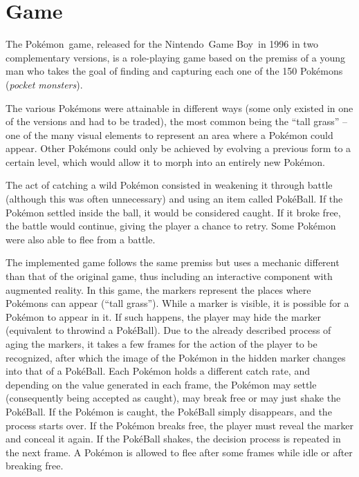 \section{Game}
\label{sec:game}

The Pokémon\textregistered\ game, released for the Nintendo\textregistered\ Game Boy\textregistered\ in 1996 in two complementary versions, is a role-playing game based on the premiss of a young man who takes the goal of finding and capturing each one of the 150 Pokémons (\textit{pocket monsters}).

The various Pokémons were attainable in different ways (some only existed in one of the versions and had to be traded), the most common being the ``tall grass'' -- one of the many visual elements to represent an area where a Pokémon could appear. Other Pokémons could only be achieved by evolving a previous form to a certain level, which would allow it to morph into an entirely new Pokémon.

The act of catching a wild Pokémon consisted in weakening it through battle (although this was often unnecessary) and using an item called PokéBall. If the Pokémon settled inside the ball, it would be considered caught. If it broke free, the battle would continue, giving the player a chance to retry. Some Pokémon were also able to flee from a battle.

The implemented game follows the same premiss but uses a mechanic different than that of the original game, thus including an interactive component with augmented reality. In this game, the markers represent the places where Pokémons can appear (``tall grass''). While a marker is visible, it is possible for a Pokémon to appear in it. If such happens, the player may hide the marker (equivalent to throwind a PokéBall). Due to the already described process of aging the markers, it takes a few frames for the action of the player to be recognized, after which the image of the Pokémon in the hidden marker changes into that of a PokéBall. Each Pokémon holds a different catch rate, and depending on the value generated in each frame, the Pokémon may settle (consequently being accepted as caught), may break free or may just shake the PokéBall. If the Pokémon is caught, the PokéBall simply disappears, and the process starts over. If the Pokémon breaks free, the player must reveal the marker and conceal it again. If the PokéBall shakes, the decision process is repeated in the next frame. A Pokémon is allowed to flee after some frames while idle or after breaking free.


